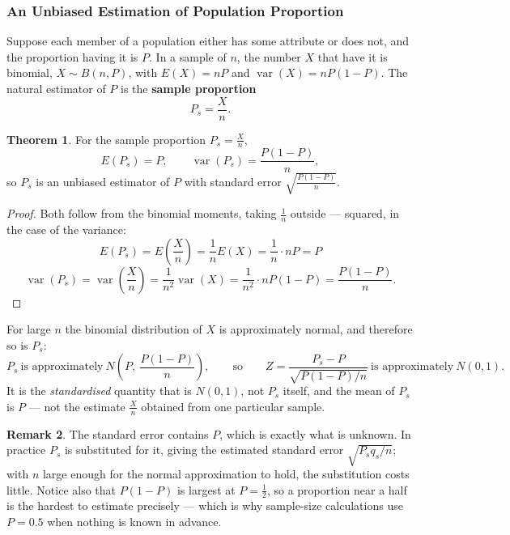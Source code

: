 \documentclass[11pt,a4paper]{article}
\theoremstyle{definition}
\newtheorem{thm}{Theorem}[section]
\newtheorem{remark}[thm]{Remark}
\begin{document}
\subsubsection{An Unbiased Estimation of Population Proportion}

Suppose each member of a population either has some attribute or does not, and the proportion
having it is $P$. In a sample of $n$, the number $X$ that have it is binomial, $X\sim B(n,P)$,
with $E(X)=nP$ and $\operatorname{var}(X)=nP(1-P)$. The natural estimator of $P$ is the
\textbf{sample proportion}
\[P_s=\frac{X}{n}.\]

\begin{thm}
For the sample proportion $P_s=\frac{X}{n}$,
\[E(P_s)=P,\qquad \operatorname{var}(P_s)=\frac{P(1-P)}{n},\]
so $P_s$ is an unbiased estimator of $P$ with standard error
$\sqrt{\frac{P(1-P)}{n}}$.
\end{thm}

\begin{proof}
Both follow from the binomial moments, taking $\frac{1}{n}$ outside --- squared, in the case
of the variance:
\[E(P_s)=E\!\left(\frac{X}{n}\right)=\frac{1}{n}E(X)=\frac{1}{n}\cdot nP=P\]
\[\operatorname{var}(P_s)=\operatorname{var}\!\left(\frac{X}{n}\right)=\frac{1}{n^2}\operatorname{var}(X)
=\frac{1}{n^2}\cdot nP(1-P)=\frac{P(1-P)}{n}.\]
\end{proof}

For large $n$ the binomial distribution of $X$ is approximately normal, and therefore so is
$P_s$:
\[P_s\ \text{is approximately}\ N\!\left(P,\ \frac{P(1-P)}{n}\right),\qquad\text{so}\qquad
Z=\frac{P_s-P}{\sqrt{P(1-P)/n}}\ \text{is approximately}\ N(0,1).\]
It is the \emph{standardised} quantity that is $N(0,1)$, not $P_s$ itself, and the mean of
$P_s$ is $P$ --- not the estimate $\frac{X}{n}$ obtained from one particular sample.

\begin{remark}
The standard error contains $P$, which is exactly what is unknown. In practice $P_s$ is
substituted for it, giving the estimated standard error $\sqrt{P_sq_s/n}$; with $n$ large
enough for the normal approximation to hold, the substitution costs little. Notice also that
$P(1-P)$ is largest at $P=\tfrac{1}{2}$, so a proportion near a half is the hardest to
estimate precisely --- which is why sample-size calculations use $P=0.5$ when nothing is known
in advance.
\end{remark}
\end{document}
